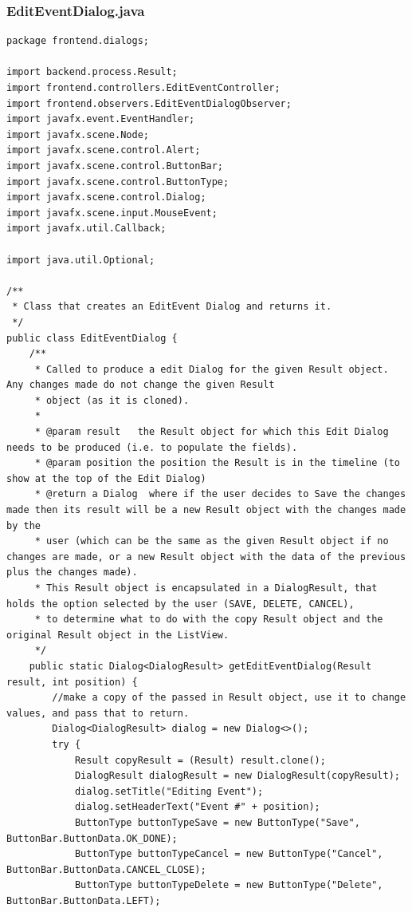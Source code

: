 \subsubsection{EditEventDialog.java}
\begin{lstlisting}
package frontend.dialogs;

import backend.process.Result;
import frontend.controllers.EditEventController;
import frontend.observers.EditEventDialogObserver;
import javafx.event.EventHandler;
import javafx.scene.Node;
import javafx.scene.control.Alert;
import javafx.scene.control.ButtonBar;
import javafx.scene.control.ButtonType;
import javafx.scene.control.Dialog;
import javafx.scene.input.MouseEvent;
import javafx.util.Callback;

import java.util.Optional;

/**
 * Class that creates an EditEvent Dialog and returns it.
 */
public class EditEventDialog {
    /**
     * Called to produce a edit Dialog for the given Result object. Any changes made do not change the given Result
     * object (as it is cloned).
     *
     * @param result   the Result object for which this Edit Dialog needs to be produced (i.e. to populate the fields).
     * @param position the position the Result is in the timeline (to show at the top of the Edit Dialog)
     * @return a Dialog  where if the user decides to Save the changes made then its result will be a new Result object with the changes made by the
     * user (which can be the same as the given Result object if no changes are made, or a new Result object with the data of the previous plus the changes made).
     * This Result object is encapsulated in a DialogResult, that holds the option selected by the user (SAVE, DELETE, CANCEL),
     * to determine what to do with the copy Result object and the original Result object in the ListView.
     */
    public static Dialog<DialogResult> getEditEventDialog(Result result, int position) {
        //make a copy of the passed in Result object, use it to change values, and pass that to return.
        Dialog<DialogResult> dialog = new Dialog<>();
        try {
            Result copyResult = (Result) result.clone();
            DialogResult dialogResult = new DialogResult(copyResult);
            dialog.setTitle("Editing Event");
            dialog.setHeaderText("Event #" + position);
            ButtonType buttonTypeSave = new ButtonType("Save", ButtonBar.ButtonData.OK_DONE);
            ButtonType buttonTypeCancel = new ButtonType("Cancel", ButtonBar.ButtonData.CANCEL_CLOSE);
            ButtonType buttonTypeDelete = new ButtonType("Delete", ButtonBar.ButtonData.LEFT);


\end{lstlisting}
